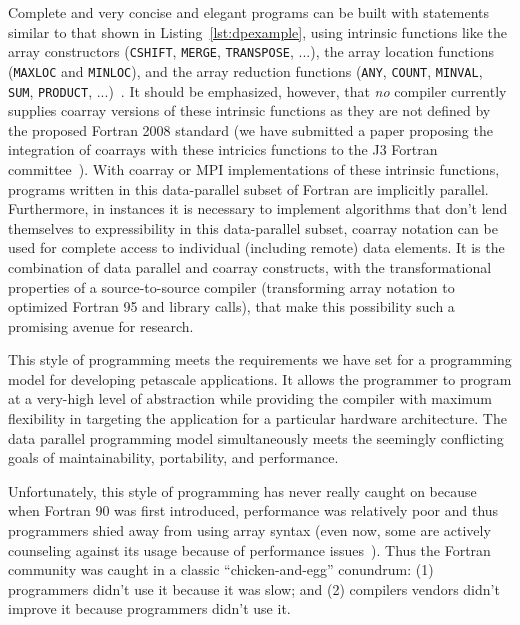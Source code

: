 \documentclass[10pt, conference, compsocconf]{IEEEtran}
\begin{document}
Complete and very concise and elegant programs can be built with statements
similar to that shown in Listing~\ref{lst:dpexample}, using intrinsic
functions like the array constructors (\texttt{CSHIFT}, \texttt{MERGE},
\texttt{TRANSPOSE}, ...), the array location functions (\texttt{MAXLOC} and
\texttt{MINLOC}), and the array reduction functions (\texttt{ANY},
\texttt{COUNT}, \texttt{MINVAL}, \texttt{SUM}, \texttt{PRODUCT},
...)~\cite{guydp}.  It should be emphasized, however, that {\it no} compiler
currently supplies coarray versions of these intrinsic functions as they are
not defined by the proposed Fortran 2008 standard (we have submitted a paper
proposing the integration of coarrays with these intricics functions to the J3
Fortran committee~\cite{rasmussen-caf-intrinsics}).  With coarray or MPI
implementations of these intrinsic functions, programs written in this
data-parallel subset of Fortran are implicitly parallel.  Furthermore, in
instances it is necessary to implement algorithms that don't lend themselves
to expressibility in this data-parallel subset, coarray notation can be used
for complete access to individual (including remote) data elements.  It is the
combination of data parallel and coarray constructs, with the transformational
properties of a source-to-source compiler (transforming array notation to
optimized Fortran 95 and library calls), that make this possibility such a
promising avenue for research.

This style of programming meets the requirements we have set for a programming
model for developing petascale applications.  It allows the programmer to
program at a very-high level of abstraction while providing the compiler with
maximum flexibility in targeting the application for a particular hardware
architecture.  The data parallel programming model simultaneously meets the
seemingly conflicting goals of maintainability, portability, and performance.

Unfortunately, this style of programming has never really caught on because
when Fortran 90 was first introduced, performance was relatively poor and thus
programmers shied away from using array syntax (even now, some are actively
counseling against its usage because of performance issues~\cite{Cray-SC07}).
Thus the Fortran community was caught in a classic ``chicken-and-egg''
conundrum: (1) programmers didn't use it because it was slow; and (2)
compilers vendors didn't improve it because programmers didn't use it.
\end{document}
